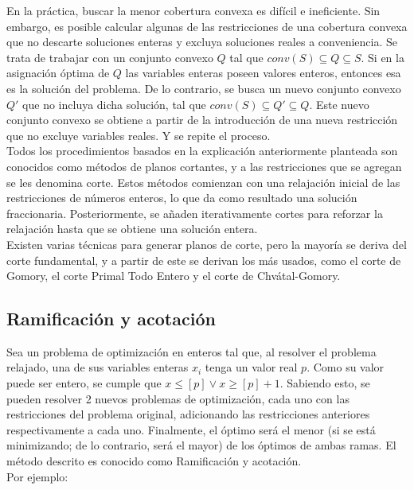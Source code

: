 \documentclass[12pt]{report}
\begin{document}
En la práctica, buscar la menor cobertura convexa es difícil e ineficiente. Sin embargo, es posible calcular algunas de las restricciones de una cobertura convexa que no descarte soluciones enteras y excluya soluciones reales a conveniencia. Se trata de trabajar con un conjunto convexo $Q$ tal que $conv(S)\subseteq Q\subseteq S$. Si en la asignación óptima de $Q$ las variables enteras poseen valores enteros, entonces esa es la solución del problema. De lo contrario, se busca un nuevo conjunto convexo $Q'$ que no incluya dicha solución, tal que $conv(S)\subseteq Q'\subseteq Q$. Este nuevo conjunto convexo se obtiene a partir de la introducción de una nueva restricción que no excluye variables reales. Y se repite el proceso.\\

Todos los procedimientos basados en la explicación anteriormente planteada son conocidos como métodos de planos cortantes, y a las restricciones que se agregan se les denomina corte. Estos métodos comienzan con una relajación inicial de las restricciones de números enteros, lo que da como resultado una solución fraccionaria. Posteriormente, se añaden iterativamente cortes para reforzar la relajación hasta que se obtiene una solución entera.\\

Existen varias técnicas para generar planos de corte, pero la mayoría se deriva del corte fundamental, y a partir de este se derivan los más usados, como el corte de Gomory, el corte Primal Todo Entero y el corte  de Chvátal-Gomory.\\


\subsection{Ramificación y acotación}

Sea un problema de optimización en enteros tal que, al resolver el problema relajado, una de sus variables enteras $x_i$ tenga un valor real $p$. Como su valor puede ser entero, se cumple que $x \leq  [p] \lor  x \geq  [p]+1$. Sabiendo esto, se pueden resolver 2 nuevos problemas de optimización, cada uno con las restricciones del problema original, adicionando las restricciones anteriores respectivamente a cada uno. Finalmente, el óptimo será el menor (si se está minimizando; de lo contrario, será el mayor) de los óptimos de ambas ramas. El método descrito es conocido como Ramificación y acotación. \\

Por ejemplo:
\end{document}
